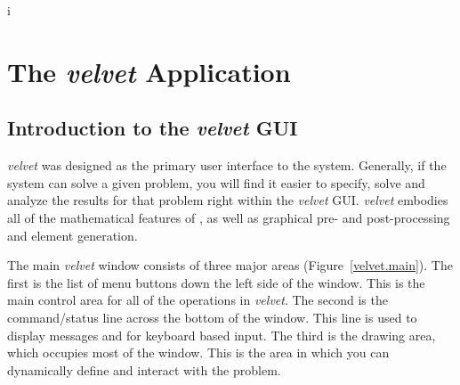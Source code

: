 i%

\newpage{\pagestyle{empty}\cleardoublepage}

\chapter{The {\em velvet} Application}
\label{velvet}

\section{Introduction to the {\em velvet} GUI}
\label{velvet.intro}

{\em velvet} was designed as the primary user interface to the \felt{}
system.  Generally, if the \felt{} system can solve a given problem,
you will find it easier to specify, solve and analyze the results for that 
problem right within the {\em velvet} GUI.  {\em velvet} embodies all of
the mathematical features of \felt{}, as well as graphical pre- and 
post-processing and element generation.

The main {\em velvet} window consists of three major areas 
(Figure~\ref{velvet.main}).  The first is the 
list of menu buttons down the left side of the window.  This is the main 
control area for all of the operations in {\em velvet}.  The second is the 
command/status line across the bottom of the window.  This line is used to 
display messages and for keyboard based input.
The third is the drawing area, which occupies most 
of the window.  This is the area in which you can dynamically define and 
interact with the \felt{} problem. 


